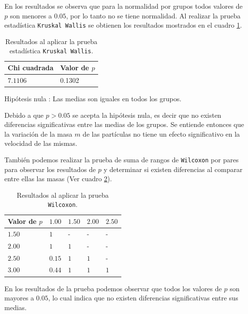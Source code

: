 \documentclass{article}
\begin{document}
En los resultados se observa que para la normalidad por grupos todos valores de $p$ son menores a $0.05$, por lo tanto no se tiene normalidad. Al realizar la prueba estadística \texttt{Kruskal Wallis} se obtienen los resultados mostrados en el cuadro \ref{Cuadro2}.

\begin{table}[h!]
\centering
\caption{Resultados al aplicar la prueba estadística \texttt{Kruskal Wallis}.}
\smallskip

\begin{tabular}{ |p{2.1cm}|p{2.1cm}|}
 \hline
 Chi cuadrada & Valor de $p$ \\
 \hline
 $7.1106$ & 0.1302 \\
 \hline
\end{tabular}
\label{Cuadro2}
\end{table}

Hipótesis nula : Las medias son iguales en todos los grupos.
\smallskip

Debido a que $p > 0.05$ se acepta la hipótesis nula, es decir que no existen diferencias significativas entre las medias de los grupos. Se entiende entonces que la variación de la masa $m$ de las partículas no tiene un efecto significativo en la velocidad de las mismas.
\bigskip

También podemos realizar la prueba de suma de rangos de \texttt{Wilcoxon} por pares para observar los resultados de $p$ y determinar si existen diferencias al comparar entre ellas las masas (Ver cuadro \ref{Cuadro3}).

\begin{table}[ht]
\centering
\caption{Resultados al aplicar la prueba \texttt{Wilcoxon}.}
\smallskip

\begin{tabular}{|p{1.7cm}|p{1.7cm}|p{1.7cm}|p{1.7cm}|p{1.7cm}|}
 \hline
Valor de $p$ & $1.00$ & $1.50$ & $2.00$ & $2.50$ \\
 \hline
 $1.50$ & $1$ & - & - & -  \\
 \hline
 $2.00$ & $1$ & $1$ & - & -  \\
 \hline
 $2.50$ & $0.15$ & $1$ & $1$ & -  \\
 \hline
 $3.00$ & $0.44$ & $1$ & $1$ & $1$  \\
 \hline
\end{tabular}
\label{Cuadro3}
\end{table}

En los resultados de la prueba podemos observar que todos los valores de $p$ son mayores a $0.05$, lo cual indica que no existen diferencias significativas entre sus medias.
\bigskip
\end{document}
